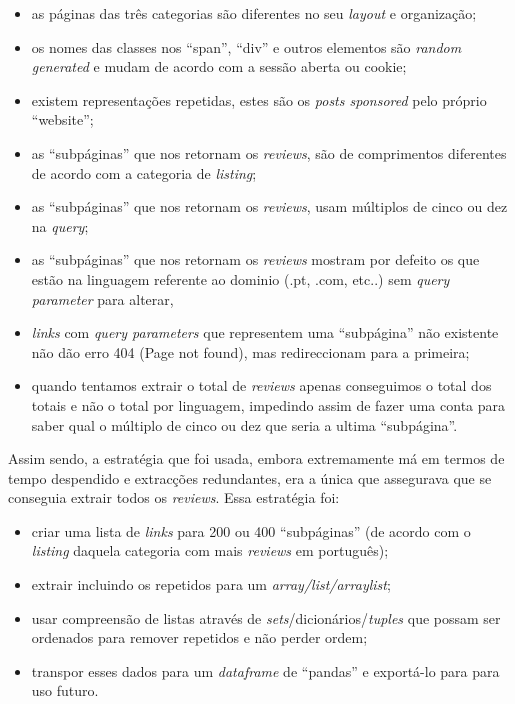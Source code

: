 \documentclass[a4paper,10pt]{article}
\begin{document}
\begin{itemize}
  \item as páginas das três categorias são diferentes no seu \textit{layout} e organização;
  \item os nomes das classes nos ``span'', ``div'' e outros elementos são \textit{random generated} e mudam de acordo com a sessão aberta ou cookie;
  \item existem representações repetidas, estes são os \textit{posts sponsored} pelo próprio ``website'';
  \item as ``subpáginas'' que nos retornam os \textit{reviews}, são de comprimentos diferentes de acordo com a categoria de \textit{listing};
  \item as ``subpáginas'' que nos retornam os \textit{reviews}, usam múltiplos de cinco ou dez na \textit{query};
  \item as ``subpáginas'' que nos retornam os \textit{reviews} mostram por defeito os que estão na linguagem referente ao dominio (.pt, .com, etc..) sem \textit{query parameter} para alterar,
  \item \textit{links} com \textit{query parameters} que representem uma ``subpágina'' não existente não dão erro 404 (Page not found), mas redireccionam para a primeira;
  \item quando tentamos extrair o total de \textit{reviews} apenas conseguimos o total dos totais e não o total por linguagem, impedindo assim de fazer uma conta para saber qual o múltiplo de cinco ou dez que seria a ultima ``subpágina''.
\end{itemize}

Assim sendo, a estratégia que foi usada, embora extremamente má em termos de tempo despendido e extracções redundantes, era a única que assegurava que se conseguia extrair todos os \textit{reviews}. Essa estratégia foi:

\begin{itemize}
  \item criar uma lista de \textit{links} para 200 ou 400 ``subpáginas'' (de acordo com o \textit{listing} daquela categoria com mais \textit{reviews} em português);
  \item extrair incluindo os repetidos para um \textit{array/list/arraylist};
  \item usar compreensão de listas através de \textit{sets}/dicionários/\textit{tuples} que possam ser ordenados para remover repetidos e não perder ordem;
  \item transpor esses dados para um \textit{dataframe} de ``pandas'' e exportá-lo para  para uso futuro.
\end{itemize}
\end{document}
